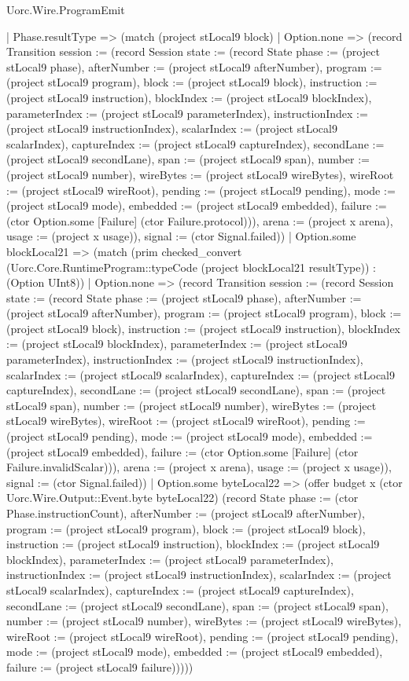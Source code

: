\begin{lexlean}{Uorc.Wire.ProgramEmit}
\begin{semanticmodule}
{        | Phase.resultType => (match (project stLocal9 block)
          | Option.none => (record Transition {session := (record Session {state := (record State {phase := (project stLocal9 phase), afterNumber := (project stLocal9 afterNumber), program := (project stLocal9 program), block := (project stLocal9 block), instruction := (project stLocal9 instruction), blockIndex := (project stLocal9 blockIndex), parameterIndex := (project stLocal9 parameterIndex), instructionIndex := (project stLocal9 instructionIndex), scalarIndex := (project stLocal9 scalarIndex), captureIndex := (project stLocal9 captureIndex), secondLane := (project stLocal9 secondLane), span := (project stLocal9 span), number := (project stLocal9 number), wireBytes := (project stLocal9 wireBytes), wireRoot := (project stLocal9 wireRoot), pending := (project stLocal9 pending), mode := (project stLocal9 mode), embedded := (project stLocal9 embedded), failure := (ctor Option.some [Failure] (ctor Failure.protocol))}), arena := (project x arena), usage := (project x usage)}), signal := (ctor Signal.failed)})
          | Option.some blockLocal21 => (match (prim checked_convert (Uorc.Core.RuntimeProgram::typeCode (project blockLocal21 resultType)) : (Option UInt8))
            | Option.none => (record Transition {session := (record Session {state := (record State {phase := (project stLocal9 phase), afterNumber := (project stLocal9 afterNumber), program := (project stLocal9 program), block := (project stLocal9 block), instruction := (project stLocal9 instruction), blockIndex := (project stLocal9 blockIndex), parameterIndex := (project stLocal9 parameterIndex), instructionIndex := (project stLocal9 instructionIndex), scalarIndex := (project stLocal9 scalarIndex), captureIndex := (project stLocal9 captureIndex), secondLane := (project stLocal9 secondLane), span := (project stLocal9 span), number := (project stLocal9 number), wireBytes := (project stLocal9 wireBytes), wireRoot := (project stLocal9 wireRoot), pending := (project stLocal9 pending), mode := (project stLocal9 mode), embedded := (project stLocal9 embedded), failure := (ctor Option.some [Failure] (ctor Failure.invalidScalar))}), arena := (project x arena), usage := (project x usage)}), signal := (ctor Signal.failed)})
            | Option.some byteLocal22 => (offer budget x (ctor Uorc.Wire.Output::Event.byte byteLocal22) (record State {phase := (ctor Phase.instructionCount), afterNumber := (project stLocal9 afterNumber), program := (project stLocal9 program), block := (project stLocal9 block), instruction := (project stLocal9 instruction), blockIndex := (project stLocal9 blockIndex), parameterIndex := (project stLocal9 parameterIndex), instructionIndex := (project stLocal9 instructionIndex), scalarIndex := (project stLocal9 scalarIndex), captureIndex := (project stLocal9 captureIndex), secondLane := (project stLocal9 secondLane), span := (project stLocal9 span), number := (project stLocal9 number), wireBytes := (project stLocal9 wireBytes), wireRoot := (project stLocal9 wireRoot), pending := (project stLocal9 pending), mode := (project stLocal9 mode), embedded := (project stLocal9 embedded), failure := (project stLocal9 failure)}))))
}
\end{semanticmodule}
\end{lexlean}
